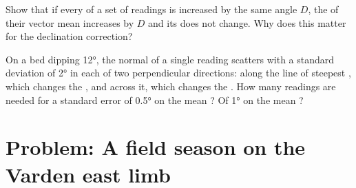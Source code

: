 \begin{exercise}[$\star\star\star$]\label{exo:b1:field-lab-methods-1:11}
Show that if every  of a set of readings is increased by the
same angle $D$, the  of their vector mean increases by $D$ and
its  does not change. Why does this matter for the declination correction?
\end{exercise}

\begin{exercise}[$\star\star\star$]\label{exo:b1:field-lab-methods-1:12}
On a bed dipping \ang{12}, the normal of a single reading scatters with a
standard deviation of \ang{2} in each of two perpendicular directions: along
the line of steepest , which changes the , and across it, which changes
the . How many readings are needed for a standard error of
\ang{0.5} on the mean ? Of \ang{1} on the mean ?
\end{exercise}

\section{Problem: A field season on the Varden east limb}

